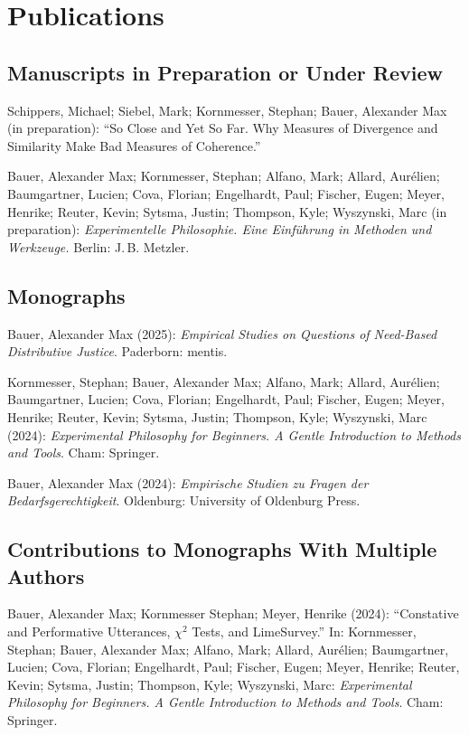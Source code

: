 \documentclass[a4paper,10pt]{article}
\newenvironment{literature}{%
   \parskip6pt\parindent0pt\raggedright
   \def\lititem{\hangindent=1cm\hangafter1}}{%
   \par\ignorespaces}
\begin{document}
\clearpage
\section{Publications}


\subsection*{Manuscripts in Preparation or Under Review}
\begin{literature}
\lititem Schippers, Michael; Siebel, Mark; Kornmesser, Stephan; Bauer, Alexander Max (in preparation): \enquote{So Close and Yet So Far. Why Measures of Divergence and Similarity Make Bad Measures of Coherence.}

\lititem Bauer, Alexander Max; Kornmesser, Stephan; Alfano, Mark; Allard, Aurélien; Baumgartner, Lucien; Cova, Florian; Engelhardt, Paul; Fischer, Eugen; Meyer, Henrike; Reuter, Kevin; Sytsma, Justin; Thompson, Kyle; Wyszynski, Marc (in preparation): \textit{Experimentelle Philosophie. Eine Einführung in Methoden und Werkzeuge.} Berlin: J.\,B. Metzler.
\end{literature}


\subsection*{Monographs}
\begin{literature}
\lititem Bauer, Alexander Max (2025): \textit{Empirical Studies on Questions of Need-Based Distributive Justice}. Paderborn: mentis.

\lititem Kornmesser, Stephan; Bauer, Alexander Max; Alfano, Mark; Allard, Aurélien; Baumgartner, Lucien; Cova, Florian; Engelhardt, Paul; Fischer, Eugen; Meyer, Henrike; Reuter, Kevin; Sytsma, Justin; Thompson, Kyle; Wyszynski, Marc (2024): \textit{Experimental Philosophy for Beginners. A Gentle Introduction to Methods and Tools}. Cham: Springer.

\lititem Bauer, Alexander Max (2024): \textit{Empirische Studien zu Fragen der Bedarfsgerechtigkeit}. Oldenburg: University of Oldenburg Press.
\end{literature}


\subsection*{Contributions to Monographs With Multiple Authors}
\begin{literature}
\lititem Bauer, Alexander Max; Kornmesser Stephan; Meyer, Henrike (2024): \enquote{Constative and Performative Utterances, $\chi^2$ Tests, and LimeSurvey.} In: Kornmesser, Stephan; Bauer, Alexander Max; Alfano, Mark; Allard, Aurélien; Baumgartner, Lucien; Cova, Florian; Engelhardt, Paul; Fischer, Eugen; Meyer, Henrike; Reuter, Kevin; Sytsma, Justin; Thompson, Kyle; Wyszynski, Marc: \textit{Experimental Philosophy for Beginners. A Gentle Introduction to Methods and Tools}. Cham: Springer.
\end{literature}
\end{document}

